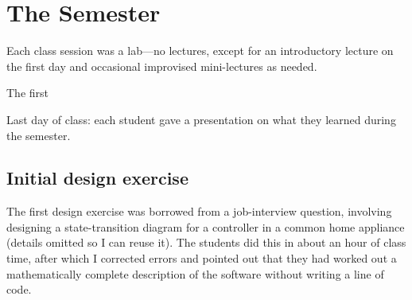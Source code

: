 \documentclass{article}
\begin{document}
\section{The Semester}

\begin{comment}
Three problems were evident before the semester began.

First, what is software design, anyway? The term is highly ambiguous.
Different experts hold radically different conceptions, from
James Reeves' view that ``the source code is the
design''\cite{reeves1992software} to IEEE~1016--2009, which specifies
12~``design viewpoints'', each with its own design entities, design
relationships, and design attributes, to be described in a design language
such as UML\cite{IEEE1016-2009}. The number of aspects or elements of software
design is mind-boggling, and each comes with its own opinionated camps and
controversies: high-level design, low-level design, system design, interface
design (which can mean user-interface design, interaction design,
communication protocols, or class method signatures, depending on who's
talking), database design, architectural design, GoF design patterns, ways of
organizing source code into subroutines, and more.

The sea of ambiguity and opinion surrounding ``software design''

Solution: I took the union of all theories of design, and announced on
the first day that the entire field of software design is a matter of
opinion (including this very statement). %


\end{comment}

Each class session was a lab---no lectures, except for an introductory lecture
on the first day and occasional improvised mini-lectures as needed.

The first 

Last day of class: each student gave a presentation on what they learned
during the semester.

\subsection{Initial design exercise}

The first design exercise was borrowed from a job-interview question,
involving designing a state-transition diagram for a controller in a common
home appliance (details omitted so I can reuse it). The students did this in
about an hour of class time, after which I corrected errors and pointed out
that they had worked out a mathematically complete description of the software
without writing a line of code.
\end{document}
